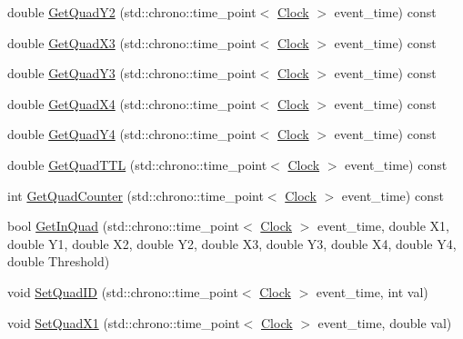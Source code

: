 \begin{DoxyCompactItemize}
\item 
double \mbox{\hyperlink{classQuad_a8f10730993f6c6310f18431a81fb352a}{Get\+Quad\+Y2}} (std\+::chrono\+::time\+\_\+point$<$ \mbox{\hyperlink{universe_8h_a0ef8d951d1ca5ab3cfaf7ab4c7a6fd80}{Clock}} $>$ event\+\_\+time) const
\item 
double \mbox{\hyperlink{classQuad_aaa044d9683717efd054d82f553b3337d}{Get\+Quad\+X3}} (std\+::chrono\+::time\+\_\+point$<$ \mbox{\hyperlink{universe_8h_a0ef8d951d1ca5ab3cfaf7ab4c7a6fd80}{Clock}} $>$ event\+\_\+time) const
\item 
double \mbox{\hyperlink{classQuad_a9cdb9ea12e3aa3eb0e471015d4cb46bb}{Get\+Quad\+Y3}} (std\+::chrono\+::time\+\_\+point$<$ \mbox{\hyperlink{universe_8h_a0ef8d951d1ca5ab3cfaf7ab4c7a6fd80}{Clock}} $>$ event\+\_\+time) const
\item 
double \mbox{\hyperlink{classQuad_a07884076387e255aa09ca8b0ac7ff599}{Get\+Quad\+X4}} (std\+::chrono\+::time\+\_\+point$<$ \mbox{\hyperlink{universe_8h_a0ef8d951d1ca5ab3cfaf7ab4c7a6fd80}{Clock}} $>$ event\+\_\+time) const
\item 
double \mbox{\hyperlink{classQuad_aff3097e4988549376102daf18b582a0b}{Get\+Quad\+Y4}} (std\+::chrono\+::time\+\_\+point$<$ \mbox{\hyperlink{universe_8h_a0ef8d951d1ca5ab3cfaf7ab4c7a6fd80}{Clock}} $>$ event\+\_\+time) const
\item 
double \mbox{\hyperlink{classQuad_ab17ff4d689675e80107ecf6588811eee}{Get\+Quad\+T\+TL}} (std\+::chrono\+::time\+\_\+point$<$ \mbox{\hyperlink{universe_8h_a0ef8d951d1ca5ab3cfaf7ab4c7a6fd80}{Clock}} $>$ event\+\_\+time) const
\item 
int \mbox{\hyperlink{classQuad_a56ac193fa18af6ec468463cc16588cc1}{Get\+Quad\+Counter}} (std\+::chrono\+::time\+\_\+point$<$ \mbox{\hyperlink{universe_8h_a0ef8d951d1ca5ab3cfaf7ab4c7a6fd80}{Clock}} $>$ event\+\_\+time) const
\item 
bool \mbox{\hyperlink{classQuad_a80c2eb7c282e1566c5f7f235611b6206}{Get\+In\+Quad}} (std\+::chrono\+::time\+\_\+point$<$ \mbox{\hyperlink{universe_8h_a0ef8d951d1ca5ab3cfaf7ab4c7a6fd80}{Clock}} $>$ event\+\_\+time, double X1, double Y1, double X2, double Y2, double X3, double Y3, double X4, double Y4, double Threshold)
\item 
void \mbox{\hyperlink{classQuad_a9900acc75445ebc71aba2307e3fe0131}{Set\+Quad\+ID}} (std\+::chrono\+::time\+\_\+point$<$ \mbox{\hyperlink{universe_8h_a0ef8d951d1ca5ab3cfaf7ab4c7a6fd80}{Clock}} $>$ event\+\_\+time, int val)
\item 
void \mbox{\hyperlink{classQuad_a05fb7c22bfef542b99d04f968b4e18ab}{Set\+Quad\+X1}} (std\+::chrono\+::time\+\_\+point$<$ \mbox{\hyperlink{universe_8h_a0ef8d951d1ca5ab3cfaf7ab4c7a6fd80}{Clock}} $>$ event\+\_\+time, double val)

\end{DoxyCompactItemize}
